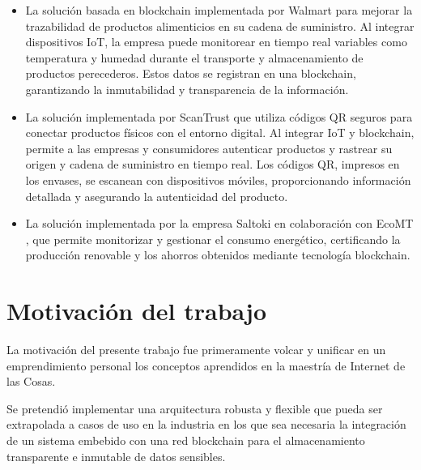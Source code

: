 \begin{itemize}

	\item La solución basada en blockchain implementada por Walmart \citep{iot_usecase_blockchain_walmart} para mejorar la trazabilidad de productos alimenticios en su cadena de suministro. Al integrar dispositivos IoT, la empresa puede monitorear en tiempo real variables como temperatura y humedad durante el transporte y almacenamiento de productos perecederos. Estos datos se registran en una blockchain, garantizando la inmutabilidad y transparencia de la información.
	
\item La solución implementada por ScanTrust \citep{iot_usecase_blockchain_scantrust} que utiliza códigos QR seguros para conectar productos físicos con el entorno digital. Al integrar IoT y blockchain, permite a las empresas y consumidores autenticar productos y rastrear su origen y cadena de suministro en tiempo real. Los códigos QR, impresos en los envases, se escanean con dispositivos móviles, proporcionando información detallada y asegurando la autenticidad del producto.
		
	
	\item La solución implementada por la empresa Saltoki en colaboración con EcoMT \citep{iot_usecase_blockchain_saltoki}, que permite monitorizar y gestionar el consumo energético, certificando la producción renovable y los ahorros obtenidos mediante tecnología blockchain. 
	
	
\end{itemize}




\section{Motivación del trabajo}


La motivación del presente trabajo fue primeramente volcar y unificar en un emprendimiento personal los conceptos aprendidos en la maestría de Internet de las Cosas. 

Se pretendió implementar una arquitectura robusta y flexible que pueda ser extrapolada a casos de uso en la industria en los que sea necesaria la integración de un sistema embebido con una red blockchain para el almacenamiento transparente e inmutable de datos sensibles.  

